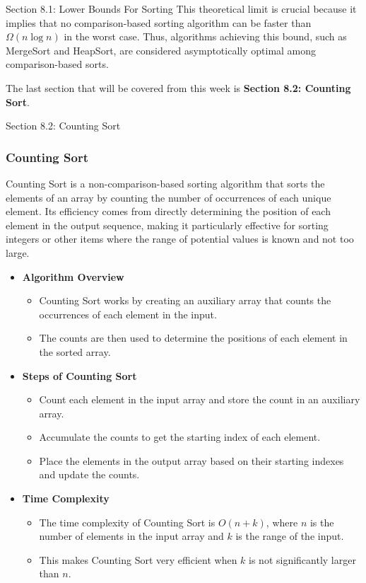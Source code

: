 \begin{notes}{Section 8.1: Lower Bounds For Sorting}
    This theoretical limit is crucial because it implies that no comparison-based sorting algorithm can be faster than $\Omega(n \log n)$ in the worst case. Thus, algorithms achieving this bound, such 
    as MergeSort and HeapSort, are considered asymptotically optimal among comparison-based sorts.    
\end{notes}

The last section that will be covered from this week is \textbf{Section 8.2: Counting Sort}.

\begin{notes}{Section 8.2: Counting Sort}
    \subsubsection*{Counting Sort}

    Counting Sort is a non-comparison-based sorting algorithm that sorts the elements of an array by counting the number of occurrences of each unique element. Its efficiency comes from directly 
    determining the position of each element in the output sequence, making it particularly effective for sorting integers or other items where the range of potential values is known and not too large.
    
    \begin{itemize}
        \item \textbf{Algorithm Overview}
        \begin{itemize}
            \item Counting Sort works by creating an auxiliary array that counts the occurrences of each element in the input.
            \item The counts are then used to determine the positions of each element in the sorted array.
        \end{itemize}
        
        \item \textbf{Steps of Counting Sort}
        \begin{itemize}
            \item Count each element in the input array and store the count in an auxiliary array.
            \item Accumulate the counts to get the starting index of each element.
            \item Place the elements in the output array based on their starting indexes and update the counts.
        \end{itemize}
        
        \item \textbf{Time Complexity}
        \begin{itemize}
            \item The time complexity of Counting Sort is $O(n + k)$, where $n$ is the number of elements in the input array and $k$ is the range of the input.
            \item This makes Counting Sort very efficient when $k$ is not significantly larger than $n$.
        \end{itemize}
    \end{itemize}
    

\end{notes}
